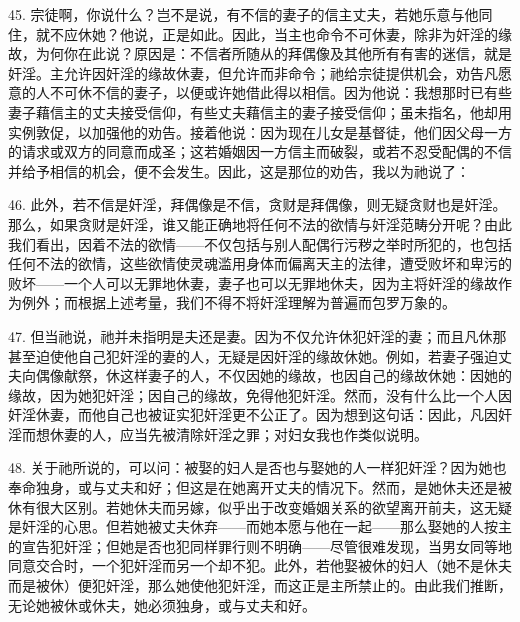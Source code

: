 45. 宗徒啊，你说什么？岂不是说，有不信的妻子的信主丈夫，若她乐意与他同住，就不应休她？他说，正是如此。因此，当主也命令不可休妻，除非为奸淫的缘故，为何你在此说？原因是：不信者所随从的拜偶像及其他所有有害的迷信，就是奸淫。主允许因奸淫的缘故休妻，但允许而非命令；祂给宗徒提供机会，劝告凡愿意的人不可休不信的妻子，以便或许她借此得以相信。因为他说：我想那时已有些妻子藉信主的丈夫接受信仰，有些丈夫藉信主的妻子接受信仰；虽未指名，他却用实例敦促，以加强他的劝告。接着他说：因为现在儿女是基督徒，他们因父母一方的请求或双方的同意而成圣；这若婚姻因一方信主而破裂，或若不忍受配偶的不信并给予相信的机会，便不会发生。因此，这是那位的劝告，我以为祂说了：\par

46. 此外，若不信是奸淫，拜偶像是不信，贪财是拜偶像，则无疑贪财也是奸淫。那么，如果贪财是奸淫，谁又能正确地将任何不法的欲情与奸淫范畴分开呢？由此我们看出，因着不法的欲情——不仅包括与别人配偶行污秽之举时所犯的，也包括任何不法的欲情，这些欲情使灵魂滥用身体而偏离天主的法律，遭受败坏和卑污的败坏——一个人可以无罪地休妻，妻子也可以无罪地休夫，因为主将奸淫的缘故作为例外；而根据上述考量，我们不得不将奸淫理解为普遍而包罗万象的。\par

47. 但当祂说，祂并未指明是夫还是妻。因为不仅允许休犯奸淫的妻；而且凡休那甚至迫使他自己犯奸淫的妻的人，无疑是因奸淫的缘故休她。例如，若妻子强迫丈夫向偶像献祭，休这样妻子的人，不仅因她的缘故，也因自己的缘故休她：因她的缘故，因为她犯奸淫；因自己的缘故，免得他犯奸淫。然而，没有什么比一个人因奸淫休妻，而他自己也被证实犯奸淫更不公正了。因为想到这句话：因此，凡因奸淫而想休妻的人，应当先被清除奸淫之罪；对妇女我也作类似说明。\par

48. 关于祂所说的，可以问：被娶的妇人是否也与娶她的人一样犯奸淫？因为她也奉命独身，或与丈夫和好；但这是在她离开丈夫的情况下。然而，是她休夫还是被休有很大区别。若她休夫而另嫁，似乎出于改变婚姻关系的欲望离开前夫，这无疑是奸淫的心思。但若她被丈夫休弃——而她本愿与他在一起——那么娶她的人按主的宣告犯奸淫；但她是否也犯同样罪行则不明确——尽管很难发现，当男女同等地同意交合时，一个犯奸淫而另一个却不犯。此外，若他娶被休的妇人（她不是休夫而是被休）便犯奸淫，那么她使他犯奸淫，而这正是主所禁止的。由此我们推断，无论她被休或休夫，她必须独身，或与丈夫和好。\par

